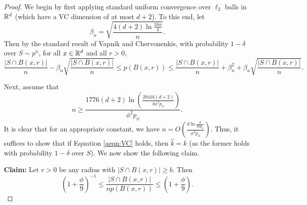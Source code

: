 \begin{proof}
We begin by first applying standard uniform convergence over $\ell_2$ balls in $\mathbb{R}^d$ (which have a VC dimension of at most $d+2$). To this end, let $$\beta_n = \sqrt{\frac{4(d+2)\ln \frac{16n}{\delta}}{n}}.$$ Then by the standard result of Vapnik and Chervonenkis, with probability $1-\delta$ over $S \sim p^n$, for all $x \in \mathbb{R}^d$ and all $r > 0$, 
\begin{equation}\label{aeqn:VC}
\frac{|S \cap B(x,r)|}{n} - \beta_n\sqrt{\frac{|S \cap B(x,r)|}{n}} \leq p(B(x,r)) \leq \frac{|S \cap B(x,r)|}{n} + \beta_n^2 + \beta_n\sqrt{\frac{|S \cap B(x,r)|}{n}}.
\end{equation}

Next, assume that 
\begin{equation}\label{aeqn:bound_n}
n \geq \frac{1776(d+2)\ln \left(\frac{28416(d+2)}{\delta \phi^2 p_\phi} \right)}{\phi^2 p_\phi}.
\end{equation} 
It is clear that for an appropriate constant, we have $n = O \left(\frac{d\ln\frac{d}{\delta \phi p_\phi}}{\phi^2 p_\phi} \right)$. Thus, it suffices to show that if Equation \ref{aeqn:VC} holds, then $\hat{k} = k$ (as the former holds with probability $1-\delta$ over $S$). We now show the following claim.

\textbf{Claim:} Let $r > 0$ be any radius with $|S \cap B(x, r)| \geq b$. Then $$\left(1 + \frac{\phi}{9}\right)^{-1} \leq \frac{|S \cap B(x, r)|}{n p(B(x, r))} \leq \left(1 + \frac{\phi}{9} \right).$$ 


\end{proof}
